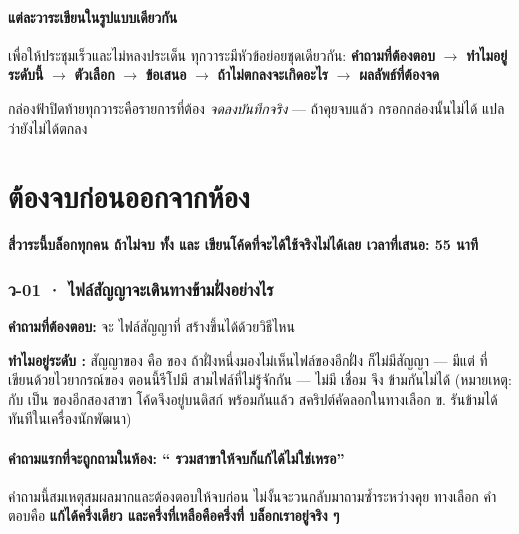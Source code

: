 \subsection*{แต่ละวาระเขียนในรูปแบบเดียวกัน}

เพื่อให้ประชุมเร็วและไม่หลงประเด็น ทุกวาระมีหัวข้อย่อยชุดเดียวกัน:
\textbf{คำถามที่ต้องตอบ} $\to$ \textbf{ทำไมอยู่ระดับนี้} $\to$
\textbf{ตัวเลือก} $\to$ \textbf{ข้อเสนอ} $\to$ \textbf{ถ้าไม่ตกลงจะเกิดอะไร}
$\to$ \textbf{ผลลัพธ์ที่ต้องจด}

กล่องฟ้าปิดท้ายทุกวาระคือรายการที่ต้อง \emph{จดลงบันทึกจริง} --- ถ้าคุยจบแล้ว
กรอกกล่องนั้นไม่ได้ แปลว่ายังไม่ได้ตกลง

\clearpage

\part{\pzero{} ต้องจบก่อนออกจากห้อง}

\textbf{สี่วาระนี้บล็อกทุกคน ถ้าไม่จบ ทั้ง  และ 
เขียนโค้ดที่จะได้ใช้จริงไม่ได้เลย เวลาที่เสนอ: 55 นาที}

\section{ว-01 · ไฟล์สัญญาจะเดินทางข้ามฝั่งอย่างไร}

\textbf{คำถามที่ต้องตอบ:}  จะ  ไฟล์สัญญาที่
 สร้างขึ้นได้ด้วยวิธีไหน

\textbf{ทำไมอยู่ระดับ \pzero{}:} สัญญาของ  คือ  ของ
 ถ้าฝั่งหนึ่งมองไม่เห็นไฟล์ของอีกฝั่ง ก็ไม่มีสัญญา ---
มีแต่  ที่เขียนด้วยไวยากรณ์ของ  ตอนนี้รีโปมี
 สามไฟล์ที่ไม่รู้จักกัน --- ไม่มี  เชื่อม
จึง  ข้ามกันไม่ได้ (หมายเหตุ:  กับ
 เป็น  ของอีกสองสาขา โค้ดจึงอยู่บนดิสก์
พร้อมกันแล้ว สคริปต์คัดลอกในทางเลือก ข. รันข้ามได้ทันทีในเครื่องนักพัฒนา)

\subsection{คำถามแรกที่จะถูกถามในห้อง: `` รวมสาขาให้จบก็แก้ได้ไม่ใช่เหรอ''}

คำถามนี้สมเหตุสมผลมากและต้องตอบให้จบก่อน ไม่งั้นจะวนกลับมาถามซ้ำระหว่างคุย
ทางเลือก คำตอบคือ \textbf{ แก้ได้ครึ่งเดียว และครึ่งที่เหลือคือครึ่งที่
บล็อกเราอยู่จริง ๆ}

